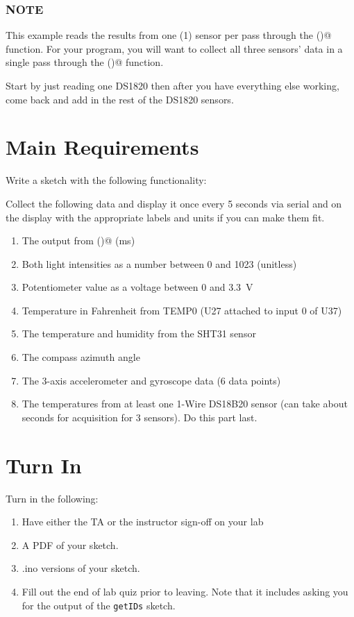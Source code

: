 \subsubsection{NOTE}
This example reads the results from one (1) sensor per pass through the 
\lstinline@loop()@ function. For your program, you will want to collect 
all three sensors' data in a single pass through the \lstinline@loop()@ 
function. 

Start by just reading one DS1820 then after you have everything
else working, come back and add in the rest of the DS1820 sensors.

\section{Main Requirements}
Write a sketch with the following functionality:

Collect the following data and display it once every 5 seconds via serial and on 
the display with the appropriate labels and units if you can make them fit.
\begin{enumerate}
	\item The output from \lstinline@millis()@ (ms)
	\item Both light intensities as a number between 0 and 1023 (unitless)
	\item Potentiometer value as a voltage between 0 and 3.3~V
	\item Temperature in Fahrenheit from TEMP0 (U27 attached to input 0 of U37)
	\item The temperature and humidity from the SHT31 sensor
	\item The compass azimuth angle
	\item The 3-axis accelerometer and gyroscope data (6 data points)
 	\item The temperatures from at least one 1-Wire DS18B20 sensor (can take about
            seconds for acquisition for 3 sensors). Do this part last.
\end{enumerate}

\section{Turn In}
Turn in the following:
\begin{enumerate}
    \item Have either the TA or the instructor sign-off on your lab
    \item A PDF of your sketch.
    \item .ino versions of your sketch.
    \item Fill out the end of lab quiz prior to leaving. Note that it includes asking you 
            for the output of the \lstinline$getIDs$ sketch. 
\end{enumerate}

